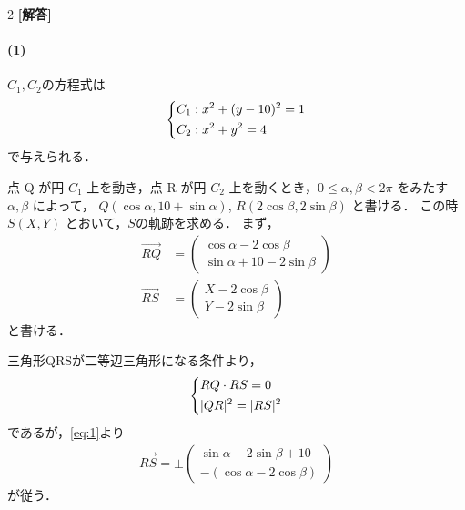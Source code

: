 \documentclass[../../main.tex]{subfiles}
\begin{document}
\setcounter{equation}{0}
\begin{oframed}
  
\end{oframed}
\setlength{\columnseprule}{0.4pt}
\begin{multicols}{2}
  {\bf [解答]}
  \paragraph{(1)}
  $C_1,C_2$の方程式は
  \begin{align}
    \begin{dcases}
      C_1 : x^2 + (y-10)^2=1 \\
      C_2 : x^2 + y^2 = 4
    \end{dcases}
  \end{align}
  で与えられる．

  点 Q が円 $C_1$ 上を動き，点 R が円 $C_2$ 上を動くとき，$0 \le \alpha, \beta < 2\pi$ をみたす $\alpha, \beta$ によって，
  $Q(\cos\alpha, 10+\sin\alpha)$, $R(2\cos\beta, 2\sin\beta)$ と書ける．
  この時$S(X, Y)$ とおいて，$S$の軌跡を求める．
  まず，
  \begin{align}
    \overrightarrow{RQ} & =
    \begin{pmatrix} \cos\alpha - 2\cos\beta \\ \sin\alpha +10 - 2\sin\beta
    \end{pmatrix}\label{eq:1} \\
    \overrightarrow{RS} & =
    \begin{pmatrix} X-2\cos\beta \\ Y-2\sin\beta
    \end{pmatrix} \label{eq:2}
  \end{align}
  と書ける．

  三角形QRSが二等辺三角形になる条件より，
  \begin{align}
    \begin{dcases}
      RQ \cdot RS = 0 \\
      |QR|^2 = |RS|^2
    \end{dcases}
  \end{align}
  であるが，\cref{eq:1}より
  \begin{align}
    \overrightarrow{RS} = \pm
    \begin{pmatrix} \sin\alpha - 2\sin\beta + 10 \\ -(\cos\alpha - 2\cos\beta)
    \end{pmatrix}
  \end{align}
  が従う．


\end{multicols}
\end{document}
